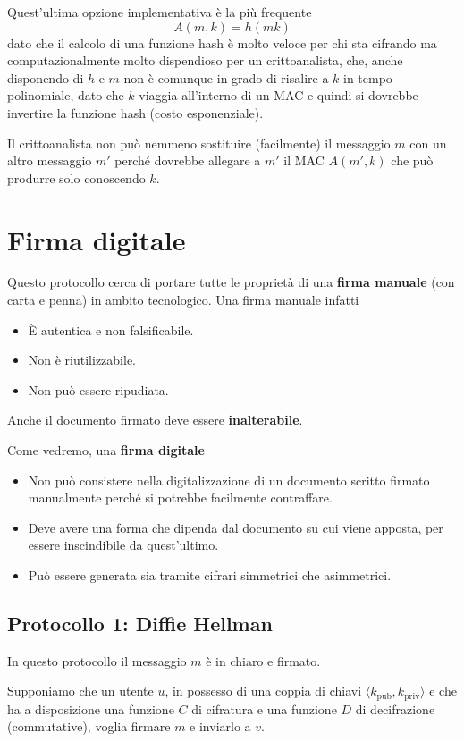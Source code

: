 Quest'ultima opzione implementativa \`e la pi\`u frequente
\[ A(m, k) = h(m k) \]
dato che il calcolo di una funzione hash \`e molto veloce per chi sta cifrando ma computazionalmente molto dispendioso
per un crittoanalista, che, anche disponendo di $h$ e $m$ non \`e comunque in grado di risalire a $k$ in tempo
polinomiale, dato che $k$ viaggia all'interno di un MAC e quindi si dovrebbe invertire la funzione hash (costo
esponenziale).

Il crittoanalista non pu\`o nemmeno sostituire (facilmente) il messaggio $m$ con un altro messaggio $m'$ perch\'e
dovrebbe allegare a $m'$ il MAC $A(m', k)$ che pu\`o produrre solo conoscendo $k$.

\section{Firma digitale}
Questo protocollo cerca di portare tutte le propriet\`a di una \textbf{firma manuale} (con carta e penna) in ambito
tecnologico. Una firma manuale infatti
\begin{itemize}
	\item \`E autentica e non falsificabile.
	\item Non \`e riutilizzabile.
	\item Non pu\`o essere ripudiata.
\end{itemize}
Anche il documento firmato deve essere \textbf{inalterabile}.

Come vedremo, una \textbf{firma digitale}
\begin{itemize}
	\item Non pu\`o consistere nella digitalizzazione di un documento scritto firmato manualmente perch\'e si
	      potrebbe facilmente contraffare.
	\item Deve avere una forma che dipenda dal documento su cui viene apposta, per essere inscindibile da
	      quest'ultimo.
	\item Pu\`o essere generata sia tramite cifrari simmetrici che asimmetrici.
\end{itemize}

\subsection{Protocollo 1: Diffie Hellman}
In questo protocollo il messaggio $m$ \`e in chiaro e firmato.

Supponiamo che un utente $u$, in possesso di una coppia di chiavi $\langle k_\text{pub}, k_\text{priv} \rangle$ e
che ha a disposizione una funzione $C$ di cifratura e una funzione $D$ di decifrazione (commutative), voglia firmare
$m$ e inviarlo a $v$.


